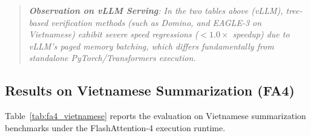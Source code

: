 \documentclass[11pt]{article}
\begin{document}
\begin{quote}
\textit{\small \textbf{Observation on vLLM Serving}: In the two tables above (vLLM), tree-based verification methods (such as Domino, and EAGLE-3 on Vietnamese) exhibit severe speed regressions ($<1.0\times$ speedup) due to vLLM's paged memory batching, which differs fundamentally from standalone PyTorch/Transformers execution.}
\end{quote}

\subsection{Results on Vietnamese Summarization (FA4)}

Table~\ref{tab:fa4_vietnamese} reports the evaluation on Vietnamese summarization benchmarks under the FlashAttention-4 execution runtime.
\end{document}
